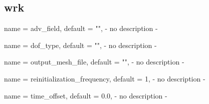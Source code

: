 \subsection{wrk}

\begin{parameter}{
    name    = {adv_field},
    default = {""},
}
- no description -
\end{parameter}

\begin{parameter}{
    name    = {dof_type},
    default = {""},
}
- no description -
\end{parameter}

\begin{parameter}{
    name    = {output_mesh_file},
    default = {""},
}
- no description -
\end{parameter}

\begin{parameter}{
    name    = {reinitialization_frequency},
    default = {1},
}
- no description -
\end{parameter}

\begin{parameter}{
    name    = {time_offset},
    default = {0.0},
}
- no description -
\end{parameter}

